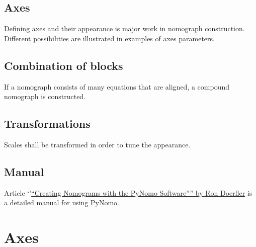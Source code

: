 \documentclass[a4paper,11pt,english]{sphinxmanual}
\begin{document}
\section{Axes}
\label{main_page:axes}
Defining axes and their appearance is major work in nomograph
construction. Different possibilities are illustrated in examples of
axes parameters.


\section{Combination of blocks}
\label{main_page:combination-of-blocks}
If a nomograph consists of many equations that are aligned, a compound
nomograph is constructed.


\section{Transformations}
\label{main_page:transformations}
Scales shall be transformed in order to tune the
appearance.


\section{Manual}
\label{main_page:manual}
Article `'\href{http://www.myreckonings.com/wordpress/}{``Creating Nomograms with the PyNomo Software'''' by Ron
Doerfler} is a detailed
manual for using PyNomo.


\chapter{Axes}
\label{axes:axes}\label{axes::doc}
\end{document}
